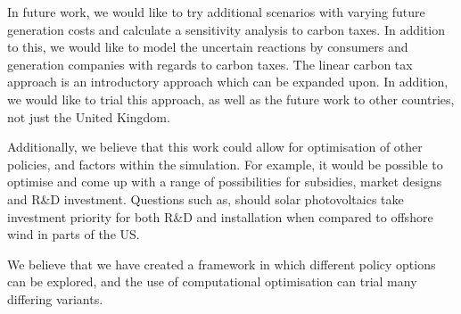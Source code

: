 In future work, we would like to try additional scenarios with varying future generation costs and calculate a sensitivity analysis to carbon taxes. In addition to this, we would like to model the uncertain reactions by consumers and generation companies with regards to carbon taxes. The linear carbon tax approach is an introductory approach which can be expanded upon. In addition, we would like to trial this approach, as well as the future work to other countries, not just the United Kingdom.

Additionally, we believe that this work could allow for optimisation of other policies, and factors within the simulation. For example, it would be possible to optimise and come up with a range of possibilities for subsidies, market designs and R\&D investment. Questions such as, should solar photovoltaics take investment priority for both R\&D and installation when compared to offshore wind in parts of the US.

We believe that we have created a framework in which different policy options can be explored, and the use of computational optimisation can trial many differing variants.

